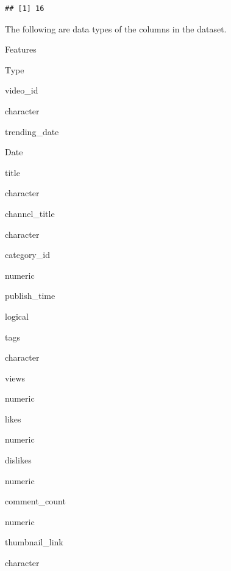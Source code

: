 \documentclass[]{article}
\newenvironment{Shaded}{\begin{snugshade}}{\end{snugshade}}
\newcommand{\DataTypeTok}[1]{\textcolor[rgb]{0.13,0.29,0.53}{#1}}
\newcommand{\KeywordTok}[1]{\textcolor[rgb]{0.13,0.29,0.53}{\textbf{#1}}}
\newcommand{\NormalTok}[1]{#1}
\newcommand{\OperatorTok}[1]{\textcolor[rgb]{0.81,0.36,0.00}{\textbf{#1}}}
\newcommand{\StringTok}[1]{\textcolor[rgb]{0.31,0.60,0.02}{#1}}
\begin{document}
\begin{verbatim}
## [1] 16
\end{verbatim}

The following are data types of the columns in the dataset.

\begin{Shaded}
\end{Shaded}

Features

Type

video\_id

character

trending\_date

Date

title

character

channel\_title

character

category\_id

numeric

publish\_time

logical

tags

character

views

numeric

likes

numeric

dislikes

numeric

comment\_count

numeric

thumbnail\_link

character
\end{document}
